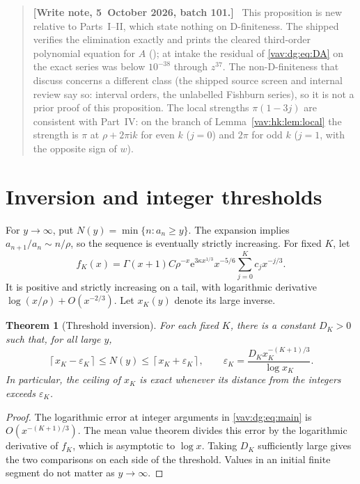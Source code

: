 \documentclass[11pt]{article}
\newtheorem{theorem}{Theorem}[section]
\theoremstyle{remark}\newtheorem{remark}[theorem]{Remark}
\newcommand{\ii}{\mathrm i}
\newenvironment{writenoteb}{\begin{quote}\small\raggedright\textbf{[Write note, 5~October 2026, batch 101.]}\ }{\end{quote}}
\newcommand{\ee}{\mathrm e}
\begin{document}
\begin{writenoteb}
This proposition is new relative to Parts~I--II, which state nothing on
D-finiteness. The shipped 
verifies the elimination exactly and prints the cleared third-order
polynomial equation for $A$ ();
at intake the residual of \eqref{vav:dg:eq:DA} on the exact series was below
$10^{-38}$ through $z^{37}$. The non-D-finiteness that
\cite{bck} discuss concerns a different class (the shipped source screen
and internal review say so: interval orders, the unlabelled Fishburn
series), so it is not a prior proof of this proposition. The local strengths
$\pi(1-3j)$ are consistent with Part~IV: on the branch of
Lemma~\ref{vav:hk:lem:local} the strength is $\pi$ at $\rho+2\pi\ii k$ for
even $k$ ($j=0$) and $2\pi$ for odd $k$ ($j=1$, with the opposite sign of
$w$).
\end{writenoteb}

\section{Inversion and integer thresholds}\label{vav:dg:sec:inverse}
For $y\to\infty$, put $N(y)=\min\{n:a_n\ge y\}$.
The expansion implies $a_{n+1}/a_n\sim n/\rho$, so the sequence is
eventually strictly increasing. For fixed $K$, let
\[
 f_K(x)=\Gamma(x+1)C\rho^{-x}
       \ee^{3\kappa x^{1/3}}x^{-5/6}
       \sum_{j=0}^{K}c_jx^{-j/3}.
\]
It is positive and strictly increasing on a tail, with logarithmic
derivative $\log(x/\rho)+O(x^{-2/3})$.
Let $x_K(y)$ denote its large inverse.

\begin{theorem}[Threshold inversion]\label{vav:dg:thm:inverse}
For each fixed $K$, there is a constant $D_K>0$ such that, for all large $y$,
\[
 \left\lceil x_K-\varepsilon_K\right\rceil
 \le N(y)\le
 \left\lceil x_K+\varepsilon_K\right\rceil,\qquad
 \varepsilon_K=
 \frac{D_Kx_K^{-(K+1)/3}}{\log x_K}.
\]
In particular, the ceiling of $x_K$ is exact whenever its distance from
the integers exceeds $\varepsilon_K$.
\end{theorem}
\begin{proof}
The logarithmic error at integer arguments in \eqref{vav:dg:eq:main} is
$O(x^{-(K+1)/3})$. The mean value theorem divides this error by
the logarithmic derivative of $f_K$, which is asymptotic to $\log x$.
Taking $D_K$ sufficiently large gives the two comparisons on each side
of the threshold. Values in an initial finite segment do not matter
as $y\to\infty$.
\end{proof}
\end{document}
